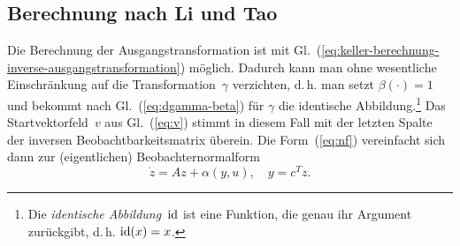 \subsection{Berechnung nach Li und Tao\label{subsec:Berechnung-nach-Li-Tao}}

Die Berechnung der Ausgangstransformation ist mit Gl.~(\ref{eq:keller-berechnung-inverse-ausgangstransformation})
möglich. Dadurch kann man ohne wesentliche Einschränkung auf die Transformation~$\gamma$
verzichten, d.\,h. man setzt $\beta(\cdot)=1$ und bekommt nach Gl.~(\ref{eq:dgamma-beta})
für $\gamma$ die identische Abbildung.\footnote{Die \emph{identische Abbildung}~${\operatorname{id}}$ ist eine Funktion, die genau
ihr Argument zurückgibt, d.\,h. ${\operatorname{id}}(x)=x$.} Das Startvektorfeld~$v$ aus Gl.~(\ref{eq:v}) stimmt in diesem
Fall mit der letzten Spalte der inversen Beobachtbarkeitsmatrix überein.
Die Form~(\ref{eq:nf}) vereinfacht sich dann zur (eigentlichen)
Beobachternormalform
\begin{equation}
\dot{z}=Az+\alpha(y,u),\quad y=c^{T}z.\label{eq:nf-ohne-gamma}
\end{equation}


